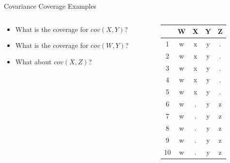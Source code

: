 \documentclass{beamer}\usepackage[]{graphicx}\usepackage[]{color}
\begin{document}
\watermarkoff %

\begin{frame}{Covariance Coverage Examples}
  
  \begin{columns}
    \begin{column}{0.5\textwidth}
      
      \begin{itemize}
      \item What is the coverage for $cov(X, Y)$?
        \vc
      \item What is the coverage for $cov(W, Y)$?
        \vc
      \item What about $cov(X, Z)$?
      \end{itemize}
      
    \end{column}
    \begin{column}{0.5\textwidth}
      
\begin{table}[ht]
\centering
\begin{tabular}{ccccc}
  \toprule
 & W & X & Y & Z \\ 
  \midrule
1 & w & x & y & . \\ 
  2 & w & x & y & . \\ 
  3 & w & x & y & . \\ 
  4 & w & x & y & . \\ 
  5 & w & x & y & . \\ 
  6 & w & . & y & z \\ 
  7 & w & . & y & z \\ 
  8 & w & . & y & z \\ 
  9 & w & . & y & z \\ 
  10 & w & . & y & z \\ 
   \bottomrule
\end{tabular}
\end{table}


\end{column}
\end{columns}
 
\end{frame}

\end{document}

